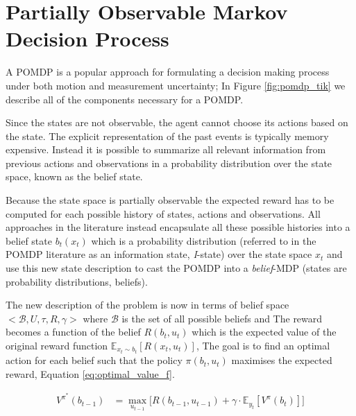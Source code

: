 \section{Partially Observable Markov Decision Process}


A POMDP is a popular approach for formulating a decision making process under both motion and measurement uncertainty;
In Figure \ref{fig:pomdp_tik} we describe all of the components necessary for a POMDP.

Since the states are not observable, the agent cannot choose its actions based on the state. The explicit 
representation of the past events is typically memory expensive. Instead it is possible to summarize all relevant 
information from previous actions and observations in a probability distribution over the state space, known as the
belief state. 

Because the state space is partially observable the expected reward has to be computed for each possible history of states, actions and observations.
All approaches in the literature instead encapsulate all these possible histories into a belief state $b_t(x_t)$ which is a 
probability distribution (referred to in the POMDP literature as an information state, \textit{I}-state) over the state space $x_t$ and use this 
new state description to cast the POMDP into a \textit{belief}-MDP (states are probability distributions, beliefs). 

The new description of the problem is now in terms of belief space $<\mathcal{B},U,\tau,R,\gamma>$ where $\mathcal{B}$ is the set of 
all possible beliefs and 
The reward becomes a function of the belief $R(b_t,u_t)$ which is the expected value of the original reward 
function $\mathbb{E}_{x_t \sim b_t}[R(x_t,u_t)]$, The goal is to find an optimal action for each belief such that 
the policy $\pi(b_t,u_t)$ maximises the expected reward, Equation \ref{eq:optimal_value_f}.

\begin{align}\label{eq:optimal_value_f}
 V^{\pi^*}(b_{t-1}) &= \max_{u_{t-1}} \bigg[ R(b_{t-1},u_{t-1}) + \gamma \cdot \mathbb{E}_{y_t}\left[ V^{\pi}(b_t)  \right] \bigg]
\end{align}

